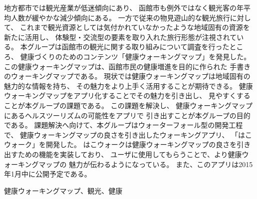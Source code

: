 \begin{jabstract}

地方都市では観光産業が低迷傾向にあり、
函館市も例外ではなく観光客の年平均人数が緩やかな減少傾向にある。
一方で従来の物見遊山的な観光旅行に対して、
これまで観光資源としては気付かれていなかったような地域固有の資源を新たに活用し、
体験型・交流型の要素を取り入れた旅行形態が注視されている。
本グループは函館市の観光に関する取り組みについて調査を行ったところ、
健康づくりのためのコンテンツ「健康ウォーキングマップ」を発見した。
この健康ウォーキングマップは、函館市民の健康増進を目的に作られた
手書きのウォーキングマップである。
現状では健康ウォーキングマップは地域固有の魅力的な情報を持ち、
その魅力をより上手く活用することが期待できる。
健康ウォーキングマップをアプリ化することでその魅力を引き出し、
見やすくすることが本グループの課題である。
この課題を解決し、
健康ウォーキングマップにあるヘルスツーリズムの可能性をアプリで
引き出すことが本グループの目的である。
課題解決へ向けて、本グループはウォーターフォール型の開発工程で、
健康ウォーキングマップの良さを引き出したウォーキングアプリ、
「はこウォーク」を開発した。
はこウォークは健康ウォーキングマップの良さを引き出すための機能を実装しており、
ユーザに使用してもらうことで、より健康ウォーキングマップの
魅力が伝わるようになっている。
また、このアプリは2015年1月中に公開予定である。

\begin{jkeyword}
健康ウォーキングマップ、観光、健康
\end{jkeyword}
\end{jabstract}
